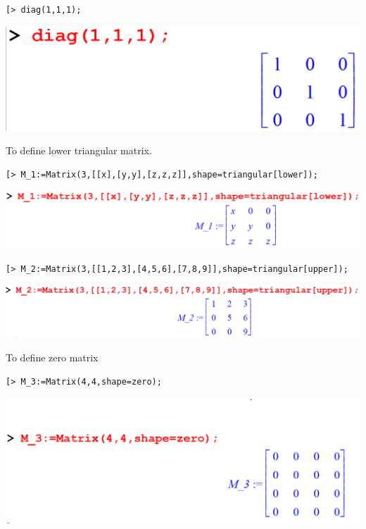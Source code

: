 \documentclass[
]{book}
\theoremstyle{definition}
\theoremstyle{definition}
\theoremstyle{definition}
\theoremstyle{definition}
\theoremstyle{remark}
\begin{document}
\begin{verbatim}
[> diag(1,1,1);
\end{verbatim}

\includegraphics{figures/Lesson 4/fig17.png}

To define lower triangular matrix.

\begin{verbatim}
[> M_1:=Matrix(3,[[x],[y,y],[z,z,z]],shape=triangular[lower]);
\end{verbatim}

\includegraphics{figures/Lesson 4/fig18.png}

\begin{verbatim}
[> M_2:=Matrix(3,[[1,2,3],[4,5,6],[7,8,9]],shape=triangular[upper]);
\end{verbatim}

\includegraphics{figures/Lesson 4/fig19.png}

To define zero matrix

\begin{verbatim}
[> M_3:=Matrix(4,4,shape=zero);
\end{verbatim}

\includegraphics{figures/Lesson 4/fig20.png}
\end{document}
